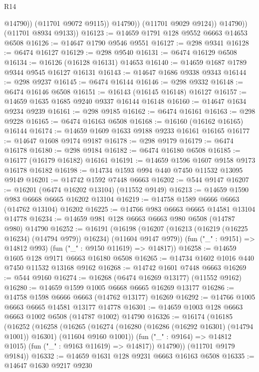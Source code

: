\begin{lexlean}{R14}
\begin{coremodule}
{{{{{{{{{{{{{{{{{{{{{{{{{{{{{{{{{{{{{{{{{{{{{{{{{{{{{{{{{{{{{{{{{{{{{{{{{{{{{{{{{{                      @14790))
                  (@11701 @9072 @9115))
                @14790))
            (@11701 @9029 @9124))
          @14790))
      (@11701 @8934 @9133))
@16123 := @14659 @1791 @128 @9552 @6663 @14653 @6508
@16126 := @14647 @1790 @9546 @9551
@16127 := @298 @9341
@16128 := @6474 @16127
@16129 := @298 @9540
@16131 := @6474 @16129 @6508
@16134 := @16126 (@16128 @16131) @14653
@16140 := @14659 @1687 @1789 @9344 @9545 @16127 @16131
@16143 := @14647 @1686 @9338 @9343
@16144 := @298 @9237
@16145 := @6474 @16144
@16146 := @298 @9332
@16148 := @6474 @16146 @6508
@16151 := @16143 (@16145 @16148) @16127
@16157 := @14659 @1635 @1685 @9240 @9337 @16144 @16148
@16160 := @14647 @1634 @9234 @9239
@16161 := @298 @9185
@16162 := @6474 @16161
@16163 := @298 @9228
@16165 := @6474 @16163 @6508
@16168 := @16160 (@16162 @16165) @16144
@16174 := @14659 @1609 @1633 @9188 @9233 @16161 @16165
@16177 := @14647 @1608 @9174 @9187
@16178 := @298 @9179
@16179 := @6474 @16178
@16180 := @298 @9184
@16182 := @6474 @16180 @6508
@16185 := @16177 (@16179 @16182) @16161
@16191 := @14659 @1596 @1607 @9158 @9173 @16178 @16182
@16198 := @14734 @1593 @994 @440 @7450 @11532 @13095 @9149
@16201 := @14742 @1592 @7448 @6663
@16202 := @544 @9147
@16207 := @16201 (@6474 @16202 @13104) (@11552 @9149)
@16213 := @14659 @1590 @983 @6668 @6665 @16202 @13104
@16219 := @14758 @1589 @6666 @6663 (@14762 @13104) @16202
@16225 := @14766 @983 @6663 @6665 @14581 @13104 @14778
@16234 := @14659 @981 @128 @6663 @6663 @980 @6508 (@14787 @980) @14790
@16252 := @16191
    (@16198
      (@16207 (@16213 (@16219 (@16225 @16234) (@14794 @979)) @16234) (@11604 @9147 @979))
      (fun ("_" : @9151) => @14812 @993)
      (fun ("_" : @9150 @11619) => @14817))
@16258 := @14659 @1605 @128 @9171 @6663 @16180 @6508
@16265 := @14734 @1602 @1016 @440 @7450 @11532 @13168 @9162
@16268 := @14742 @1601 @7448 @6663
@16269 := @544 @9160
@16274 := @16268 (@6474 @16269 @13177) (@11552 @9162)
@16280 := @14659 @1599 @1005 @6668 @6665 @16269 @13177
@16286 := @14758 @1598 @6666 @6663 (@14762 @13177) @16269
@16292 := @14766 @1005 @6663 @6665 @14581 @13177 @14778
@16301 := @14659 @1003 @128 @6663 @6663 @1002 @6508 (@14787 @1002) @14790
@16326 := @16174
    (@16185
      (@16252
        (@16258
          (@16265
            (@16274 (@16280 (@16286 (@16292 @16301) (@14794 @1001)) @16301) (@11604 @9160 @1001))
            (fun ("_" : @9164) => @14812 @1015)
            (fun ("_" : @9163 @11619) => @14817))
          @14790))
      (@11701 @9179 @9184))
@16332 := @14659 @1631 @128 @9231 @6663 @16163 @6508
@16335 := @14647 @1630 @9217 @9230
}}}}}}}}}}}}}}}}}}}}}}}}}}}}}}}}}}}}}}}}}}}}}}}}}}}}}}}}}}}}}}}}}}}}}}}}}}}}}}}}}}
\end{coremodule}
\end{lexlean}
